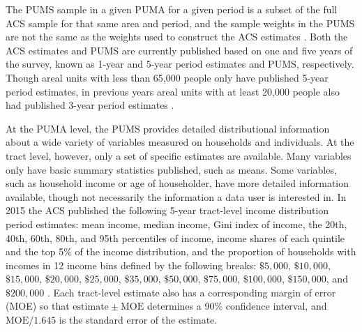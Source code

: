 \documentclass[12pt]{article}
\begin{document}
The PUMS sample in a given PUMA for a given period is a subset of the full ACS sample for that same area and period, and the sample weights in the PUMS are not the same as the weights used to construct the ACS estimates \citep{pums2015}. Both the ACS estimates and PUMS are currently published based on one and five years of the survey, known as 1-year and 5-year period estimates and PUMS, respectively. Though areal units with less than 65,000 people only have published 5-year period estimates, in previous years areal units with at least 20,000 people also had published 3-year period estimates \citep{acs2014design}.

At the PUMA level, the PUMS provides detailed distributional information about a wide variety of variables measured on households and individuals. At the tract level, however, only a set of specific estimates are available. Many variables only have basic summary statistics published, such as means. Some variables, such as household income or age of householder, have more detailed information available, though not necessarily the information a data user is interested in. In 2015 the ACS published the following 5-year tract-level income distribution period estimates: mean income, median income, Gini index of income, the 20th, 40th, 60th, 80th, and 95th percentiles of income, income shares of each quintile and the top 5\% of the income distribution, and the proportion of households with incomes in 12 income bins defined by the following breaks: $\$5,000$, $\$10,000$, $\$15,000$, $\$20,000$, $\$25,000$, $\$35,000$, $\$50,000$, $\$75,000$, $\$100,000$, $\$150,000$, and $\$200,000$ \citep{acs2015quintiles,acs2015shares,acs2015gini,acs2015income,acs2015financial}. Each tract-level estimate also has a corresponding margin of error (MOE) so that $\mathrm{estimate} \pm \mathrm{MOE}$ determines a 90\% confidence interval, and $\mathrm{MOE}/1.645$ is the standard error of the estimate.
\end{document}
